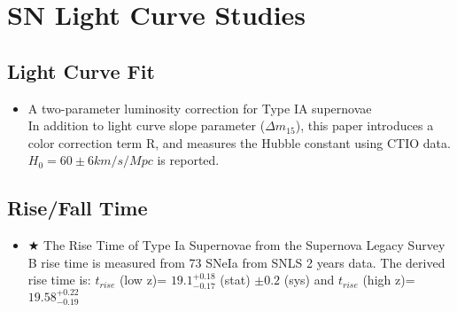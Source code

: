 \section{SN Light Curve Studies}

\subsection{Light Curve Fit}
\begin{itemize}
\item A two-parameter luminosity correction for Type IA supernovae
\citep[][\#63, 5/6/10, tripp98a]{tripp98a} \\
In addition to light curve slope parameter ($\Delta m_{15}$), this paper introduces
a color correction term R, and measures the Hubble constant using CTIO data.
$H_{0}=60 \pm 6 km/s/Mpc$ is reported.
\end{itemize}

\subsection{Rise/Fall Time}
\begin{itemize}
\item $\bigstar$ The Rise Time of Type Ia Supernovae from the Supernova Legacy Survey
\citep{conley06a}\\
B rise time is measured from 73 SNeIa from SNLS 2 years data.  The derived rise time
is: $t_{rise}$ (low z)= $19.1^{+0.18}_{-0.17}$ (stat) $\pm0.2$ (sys) and
$t_{rise}$ (high z)=$19.58^{+0.22}_{-0.19}$
\end{itemize}
